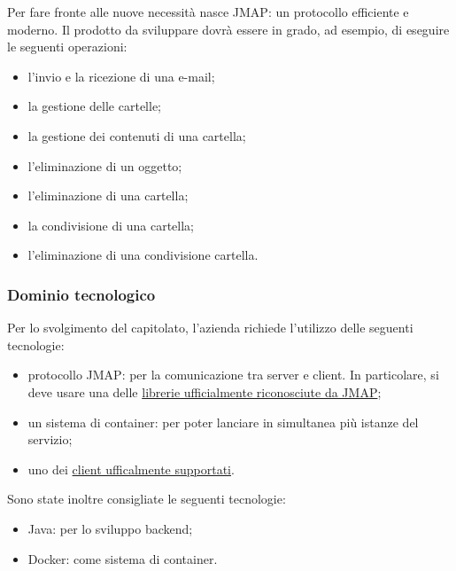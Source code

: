 		Per fare fronte alle nuove necessità nasce JMAP: un protocollo efficiente e moderno. Il prodotto da sviluppare dovrà essere in grado, ad esempio, di eseguire le seguenti operazioni:
		\begin{multicols}{2}
			\begin{itemize}
				\item l'invio e la ricezione di una e-mail;
				\item la gestione delle cartelle;
				\item la gestione dei contenuti di una cartella;
				\item l'eliminazione di un oggetto;
				\item l'eliminazione di una cartella;
				\item la condivisione di una cartella;
				\item l'eliminazione di una condivisione cartella.
			\end{itemize}
		\end{multicols}
		
	\subsubsection{Dominio tecnologico}
		Per lo svolgimento del capitolato, l'azienda richiede l'utilizzo delle seguenti tecnologie:
		\begin{itemize}
			\item protocollo JMAP: per la comunicazione tra server e client. In particolare, si deve usare una delle \href{https://jmap.io/software.html\#libraries}{librerie ufficialmente riconosciute da JMAP};
			\item un sistema di container: per poter lanciare in simultanea più istanze del servizio;
			\item uno dei \href{https://jmap.io/software.html\#clients}{client ufficalmente supportati}.
		\end{itemize}
		Sono state inoltre consigliate le seguenti tecnologie:
		\begin{itemize}
			\item Java: per lo sviluppo backend;
			\item Docker: come sistema di container.
		\end{itemize}
		
